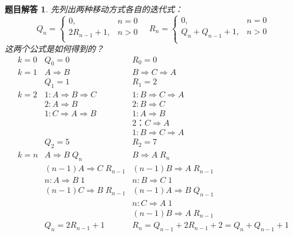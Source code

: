 \documentclass[mode=geye]{elegantnote}
\newtheorem{answer}{题目解答}
\begin{document}
\begin{answer}
	先列出两种移动方式各自的迭代式：
	\begin{equation*}
		Q_{n} = \left\{
		\begin{array}{ll}
			0 ,& n = 0 \\
			2R_{n-1}+1 ,& n>0\\
		\end{array}
		\right. \quad
		R_{n} = \left\{
		\begin{array}{ll}
			0 ,& n = 0 \\
			Q_{n}+Q_{n-1}+1 ,& n>0\\
		\end{array}
		\right.
	\end{equation*}
	这两个公式是如何得到的？
	\begin{equation*}
		\begin{array}{lll}
			k=0 & Q_{0} = 0		 					& R_{0} = 0 \\
			k=1 & A \Rightarrow B	 				& B \Rightarrow C \Rightarrow A \\
				& Q_1=1 							& R_1 = 2\\
			k=2 & 1: A \Rightarrow B \Rightarrow C 	& 1: B \Rightarrow C \Rightarrow A \\
				& 2: A \Rightarrow B 				& 2: B \Rightarrow C \\
				& 1: C \Rightarrow A \Rightarrow B  & 1: A \Rightarrow B \\
				& 									& 2：C \Rightarrow A \\
				&									& 1: B \Rightarrow C \Rightarrow A \\
				& Q_{2} = 5							& R_{2} = 7 \\
			k=n & A \Rightarrow B	\; Q_n			& B \Rightarrow A\; R_n\\
				& (n-1) A \Rightarrow C	\;R_{n-1}	& (n-1) B \Rightarrow A \; R_{n-1} \\
				& n: A \Rightarrow B	\;1			& n: B \Rightarrow C 	\; 1 \\
				& (n-1) C \Rightarrow B \;R_{n-1}	& (n-1) A \Rightarrow B \; Q_{n-1} \\
				& 									& n: C \Rightarrow A 	\; 1 \\
				& 									& (n-1) B \Rightarrow A \; R_{n-1} \\
				& Q_n = 2R_{n-1}+1					& R_{n} = Q_{n-1}+2R_{n-1}+2 = Q_{n}+Q_{n-1}+1\\
		\end{array}
	\end{equation*}
\end{answer}
\end{document}
